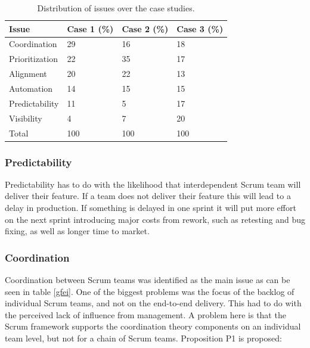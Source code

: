\begin{table}[ht!]
\begin{center}
    \begin{tabular}{| p{4.5cm} | p{3cm} | p{3cm} | p{3cm} |}
    \hline
    \textbf{Issue} & \textbf{Case 1 (\%)} & \textbf{Case 2 (\%)} & \textbf{Case 3 (\%)} \\ \hline
    Coordination & 29 & 16 & 18 \\ \hline
    Prioritization & 22 & 35 & 17  \\ \hline
    Alignment & 20 & 22 & 13 \\ \hline
    Automation & 14 & 15 & 15 \\ \hline
    Predictability & 11 & 5 & 17 \\ \hline
    Visibility & 4 & 7 & 20 \\ \hline
    Total & 100 & 100 & 100 \\ \hline
    \end{tabular}
    \caption{Distribution of issues over the case studies.}
    \label{doiotcs}
\end{center}
\end{table}

\subsubsection{Predictability}

Predictability has to do with the likelihood that interdependent Scrum team will deliver their feature. If a team does not deliver their feature this will lead to a delay in production. If something is delayed in one sprint it will put more effort on the next sprint introducing major costs from rework, such as retesting and bug fixing, as well as longer time to market.

\subsubsection{Coordination}

Coordination between Scrum teams was identified as the main issue as can be seen in table \ref{gfei}. One of the biggest problems was the focus of the backlog of individual Scrum teams, and not on the end-to-end delivery. This had to do with the perceived lack of influence from management. A problem here is that the Scrum framework supports the coordination theory components on an individual team level, but not for a chain of Scrum teams. Proposition P1 is proposed:

